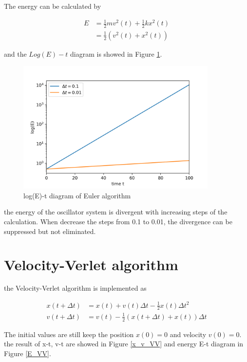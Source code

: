 \documentclass[a4paper,12pt]{article}
\begin{document}
The energy can be calculated by 

\begin{equation}
    \begin{aligned}
        E &= \frac{1}{2} mv^2(t) + \frac{1}{2} k x^2(t)\\
        &= \frac{1}{2} (v^2(t)+x^2(t))
    \end{aligned}
\end{equation}

and the $Log(E) - t$ diagram is showed in Figure \ref{E_Euler}.

\begin{figure}[!htbp]
    \centering
    \includegraphics[width=10cm]{Euler_E.png}

    \caption{log(E)-t diagram of Euler algorithm}
    \label{E_Euler}
\end{figure}

the energy of the oscillator system is divergent with increasing steps of the calculation. When decrease the steps from 0.1 to 0.01, the divergence can be suppressed but not eliminated.

\section{Velocity-Verlet algorithm}

the Velocity-Verlet algorithm is implemented as

\begin{equation}
    \begin{aligned}
    x(t+\Delta t) &= x(t)+v(t)\Delta t - \frac{1}{2} x(t) \Delta t^2  \\
    v(t+\Delta t) &= v(t)-\frac{1}{2}(x(t+\Delta t)+x(t))\Delta t        
    \end{aligned}
\end{equation}

The initial values are still keep the position $x(0) = 0$ and velocity $v(0) = 0$. the result of x-t, v-t are showed in Figure \ref{x_v_VV} and energy E-t diagram in Figure \ref{E_VV}.
\end{document}
